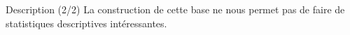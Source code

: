\documentclass[french, 9pt,xcolor={table,dvipsnames},t,aspectratio=169,onlytextwidth,mathserif]{beamer}
\begin{document}
{\begin{frame}{Description (2/2)}
    La construction de cette base ne nous permet pas de faire de statistiques descriptives intéressantes.
\end{frame}
}





\end{document}

